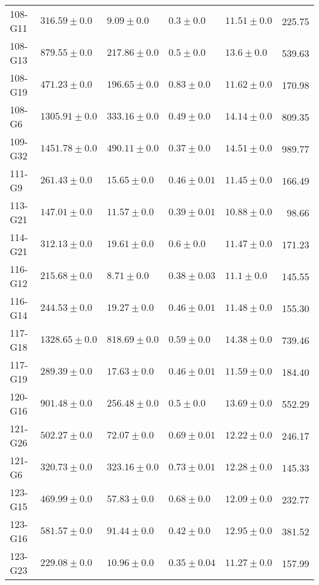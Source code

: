 \begin{tabular}{lllllr}
    108-G11 &     $316.59 \pm 0.0$ &        $9.09 \pm 0.0$ &    $0.3 \pm 0.0$ &  $11.51 \pm 0.0$ &    225.75 \\
    108-G13 &     $879.55 \pm 0.0$ &      $217.86 \pm 0.0$ &    $0.5 \pm 0.0$ &   $13.6 \pm 0.0$ &    539.63 \\
    108-G19 &     $471.23 \pm 0.0$ &      $196.65 \pm 0.0$ &   $0.83 \pm 0.0$ &  $11.62 \pm 0.0$ &    170.98 \\
     108-G6 &    $1305.91 \pm 0.0$ &      $333.16 \pm 0.0$ &   $0.49 \pm 0.0$ &  $14.14 \pm 0.0$ &    809.35 \\
    109-G32 &    $1451.78 \pm 0.0$ &      $490.11 \pm 0.0$ &   $0.37 \pm 0.0$ &  $14.51 \pm 0.0$ &    989.77 \\
     111-G9 &     $261.43 \pm 0.0$ &       $15.65 \pm 0.0$ &  $0.46 \pm 0.01$ &  $11.45 \pm 0.0$ &    166.49 \\
    113-G21 &     $147.01 \pm 0.0$ &       $11.57 \pm 0.0$ &  $0.39 \pm 0.01$ &  $10.88 \pm 0.0$ &     98.66 \\
    114-G21 &     $312.13 \pm 0.0$ &       $19.61 \pm 0.0$ &    $0.6 \pm 0.0$ &  $11.47 \pm 0.0$ &    171.23 \\
    116-G12 &     $215.68 \pm 0.0$ &        $8.71 \pm 0.0$ &  $0.38 \pm 0.03$ &   $11.1 \pm 0.0$ &    145.55 \\
    116-G14 &     $244.53 \pm 0.0$ &       $19.27 \pm 0.0$ &  $0.46 \pm 0.01$ &  $11.48 \pm 0.0$ &    155.30 \\
    117-G18 &    $1328.65 \pm 0.0$ &      $818.69 \pm 0.0$ &   $0.59 \pm 0.0$ &  $14.38 \pm 0.0$ &    739.46 \\
    117-G19 &     $289.39 \pm 0.0$ &       $17.63 \pm 0.0$ &  $0.46 \pm 0.01$ &  $11.59 \pm 0.0$ &    184.40 \\
    120-G16 &     $901.48 \pm 0.0$ &      $256.48 \pm 0.0$ &    $0.5 \pm 0.0$ &  $13.69 \pm 0.0$ &    552.29 \\
    121-G26 &     $502.27 \pm 0.0$ &       $72.07 \pm 0.0$ &  $0.69 \pm 0.01$ &  $12.22 \pm 0.0$ &    246.17 \\
     121-G6 &     $320.73 \pm 0.0$ &      $323.16 \pm 0.0$ &  $0.73 \pm 0.01$ &  $12.28 \pm 0.0$ &    145.33 \\
    123-G15 &     $469.99 \pm 0.0$ &       $57.83 \pm 0.0$ &   $0.68 \pm 0.0$ &  $12.09 \pm 0.0$ &    232.77 \\
    123-G16 &     $581.57 \pm 0.0$ &       $91.44 \pm 0.0$ &   $0.42 \pm 0.0$ &  $12.95 \pm 0.0$ &    381.52 \\
    123-G23 &     $229.08 \pm 0.0$ &       $10.96 \pm 0.0$ &  $0.35 \pm 0.04$ &  $11.27 \pm 0.0$ &    157.99 \\

\end{tabular}
